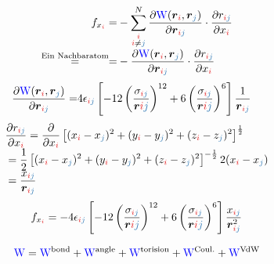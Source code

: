 \begin{notebox}\nospacing
  \begin{align*}
    f_{x_{\idxi}}=&-\sum_{\substack{\idxi\\\idxi\neq\idxj}}^{N}\frac{\partial\Wpot(\rvec_{\idxi},\rvec_{\idxj})}{\partial\rvec_{\idxi\idxj}}\cdot\pfrac{r_{\idxi\idxj}}{x_{\idxi}}\nalign
    \eqs{\text{Ein Nachbaratom}}=&-\frac{\partial\Wpot(\rvec_{\idxi},\rvec_{\idxj})}{\partial\rvec_{\idxi\idxj}}\cdot\pfrac{r_{\idxi\idxj}}{x_{\idxi}}
  \end{align*}
  \begin{align*}
    \frac{\partial\Wpot(\rvec_{\idxi},\rvec_{\idxj})}{\partial\rvec_{\idxi\idxj}}=&
    4\epsilon_{\idxi\idxj}\left[-12\left(\frac{\sigma_{\idxi\idxj}}{\rvec{\idxi\idxj}}\right)^{12}+6\left(\frac{\sigma_{\idxi\idxj}}{\rvec{\idxi\idxj}}\right)^6\right]\frac{1}{\rvec_{\idxi\idxj}}
  \end{align*}
  \begin{align*}
  &\pfrac{r_{\idxi\idxj}}{x_{\idxi}}=\frac{\partial}{\partial x_{\idxi}}\left[(x_{\idxi}-x_{\idxj})^2+(y_{\idxi}-y_{\idxj})^2+(z_{\idxi}-z_{\idxj})^2\right]^{\frac{1}{2}}\nalign
  &=\frac{1}{2}\left[(x_{\idxi}-x_{\idxj})^2+(y_{\idxi}-y_{\idxj})^2+(z_{\idxi}-z_{\idxj})^2\right]^{-\frac{1}{2}}2(x_{\idxi}-x_{\idxj})\nalign
    &=\frac{x_{\idxi\idxj}}{\rvec_{\idxi\idxj}}
  \end{align*}
  \begin{align*}
    f_{x_{\idxi}}=-4\epsilon_{\idxi\idxj}\left[-12\left(\frac{\sigma_{\idxi\idxj}}{\rvec{\idxi\idxj}}\right)^{12}+6\left(\frac{\sigma_{\idxi\idxj}}{\rvec{\idxi\idxj}}\right)^6\right]\frac{x_{\idxi\idxj}}{\rvec_{\idxi\idxj}^2}
  \end{align*}
\end{notebox}
\begin{sectionbox}\nospacing
  \begin{align}
    \textcolor{blue}{\mathrm{W}}=\textcolor{blue}{\mathrm{W}}^{\text{bond}}+\textcolor{blue}{\mathrm{W}}^{\text{angle}}+\textcolor{blue}{\mathrm{W}}^{\text{torision}}+\textcolor{blue}{\mathrm{W}}^{\text{Coul.}}+\textcolor{blue}{\mathrm{W}}^{\text{VdW}}
  \end{align}
\end{sectionbox}
